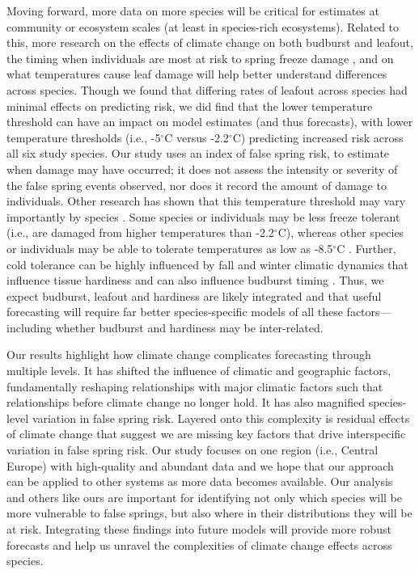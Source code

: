 \documentclass{article}\usepackage[]{graphicx}\usepackage[]{color}
\begin{document}
Moving forward, more data on more species will be critical for estimates at community or ecosystem scales (at least in species-rich ecosystems). Related to this, more research on the effects of climate change on both budburst and leafout, the timing when individuals are most at risk to spring freeze damage \citep{Chamberlain2019,Lenz2016}, and on what temperatures cause leaf damage will help better understand differences across species. Though we found that differing rates of leafout across species had minimal effects on predicting risk, we did find that the lower temperature threshold can have an impact on model estimates (and thus forecasts), with lower temperature thresholds (i.e., -5$^{\circ}$C versus -2.2$^{\circ}$C) predicting increased risk across all six study species. Our study uses an index of false spring risk, to estimate when damage may have occurred; it does not assess the intensity or severity of the false spring events observed, nor does it record the amount of damage to individuals. Other research has shown that this temperature threshold may vary importantly by species \citep{bennett2018globtherm, Korner2016, Lenz2013, Zhuo2018}. Some species or individuals may be less freeze tolerant (i.e., are damaged from higher temperatures than -2.2$^{\circ}$C), whereas other species or individuals may be able to tolerate temperatures as low as -8.5$^{\circ}$C \citep{Lenz2016}. Further, cold tolerance can be highly influenced by fall and winter climatic dynamics that influence tissue hardiness \citep{Charrier2011,Hofmann2015, Vitasse2014} and can also influence budburst timing \citep{Morin2007}. Thus, we expect budburst, leafout and hardiness are likely integrated and that useful forecasting will require far better species-specific models of all these factors---including whether budburst and hardiness may be inter-related. 

Our results highlight how climate change complicates forecasting through multiple levels. It has shifted the influence of climatic and geographic factors, fundamentally reshaping relationships with major climatic factors such that relationships before climate change no longer hold. It has also magnified species-level variation in false spring risk. Layered onto this complexity is residual effects of climate change that suggest we are missing key factors that drive interspecific variation in false spring risk. Our study focuses on one region (i.e., Central Europe) with high-quality and abundant data and we hope that our approach can be applied to other systems as more data becomes available. Our analysis and others like ours are important for identifying not only which species will be more vulnerable to false springs, but also where in their distributions they will be at risk. Integrating these findings into future models will provide more robust forecasts and help us unravel the complexities of climate change effects across species.
\end{document}
